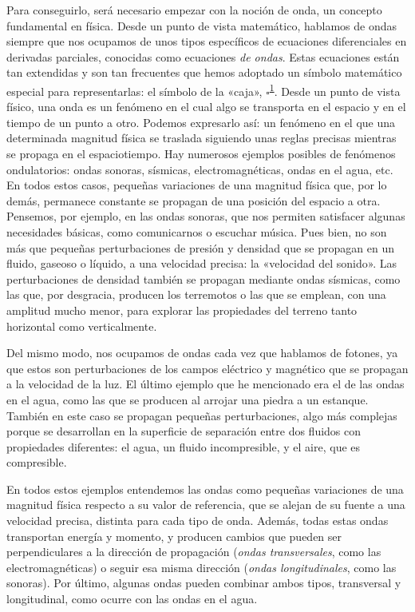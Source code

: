 Para conseguirlo, será necesario empezar con la noción de onda, un concepto fundamental en física. Desde un punto de vista matemático, hablamos de ondas siempre que nos ocupamos de unos tipos específicos de ecuaciones diferenciales en derivadas parciales, conocidas como ecuaciones \emph{de ondas}. Estas ecuaciones están tan extendidas y son tan frecuentes que hemos adoptado un símbolo matemático especial para representarlas: el símbolo de la «caja», \(\square\)\textsuperscript{\hyperlink{note:08-01}{1}}. Desde un punto de vista físico, una onda es un fenómeno en el cual algo se transporta en el espacio y en el tiempo de un punto a otro. Podemos expresarlo así: un fenómeno en el que una determinada magnitud física se traslada siguiendo unas reglas precisas mientras se propaga en el espaciotiempo. Hay numerosos ejemplos posibles de fenómenos ondulatorios: ondas sonoras, sísmicas, electromagnéticas, ondas en el agua, etc. En todos estos casos, pequeñas variaciones de una magnitud física que, por lo demás, permanece constante se propagan de una posición del espacio a otra. Pensemos, por ejemplo, en las ondas sonoras, que nos permiten satisfacer algunas necesidades básicas, como comunicarnos o escuchar música. Pues bien, no son más que pequeñas perturbaciones de presión y densidad que se propagan en un fluido, gaseoso o líquido, a una velocidad precisa: la «velocidad del sonido». Las perturbaciones de densidad también se propagan mediante ondas sísmicas, como las que, por desgracia, producen los terremotos o las que se emplean, con una amplitud mucho menor, para explorar las propiedades del terreno tanto horizontal como verticalmente.

Del mismo modo, nos ocupamos de ondas cada vez que hablamos de fotones, ya que estos son perturbaciones de los campos eléctrico y magnético que se propagan a la velocidad de la luz. El último ejemplo que he mencionado era el de las ondas en el agua, como las que se producen al arrojar una piedra a un estanque. También en este caso se propagan pequeñas perturbaciones, algo más complejas porque se desarrollan en la superficie de separación entre dos fluidos con propiedades diferentes: el agua, un fluido incompresible, y el aire, que es compresible.

En todos estos ejemplos entendemos las ondas como pequeñas variaciones de una magnitud física respecto a su valor de referencia, que se alejan de su fuente a una velocidad precisa, distinta para cada tipo de onda. Además, todas estas ondas transportan energía y momento, y producen cambios que pueden ser perpendiculares a la dirección de propagación (\emph{ondas transversales}, como las electromagnéticas) o seguir esa misma dirección (\emph{ondas longitudinales}, como las sonoras). Por último, algunas ondas pueden combinar ambos tipos, transversal y longitudinal, como ocurre con las ondas en el agua.

